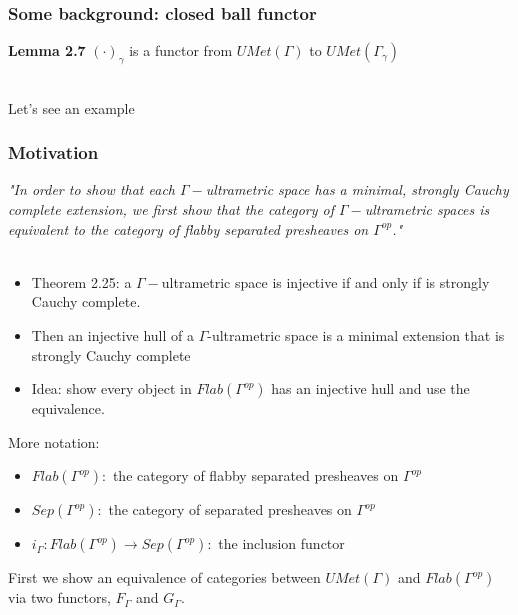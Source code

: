 \documentclass{beamer}
\begin{document}
\begin{frame}
	\frametitle{Some background: closed ball functor}
\textbf{Lemma 2.7} $(\cdot)_\gamma$ is a functor from $UMet(\Gamma)$ to $UMet(\Gamma_\gamma)$\\~\

Let's see an example
\end{frame}

\begin{frame}
\frametitle{Motivation}
\textit{"In order to show that each $\Gamma-$ultrametric space has a minimal, strongly Cauchy complete extension, we first show that the category of $\Gamma-$ultrametric spaces is equivalent to the category of flabby separated presheaves on $\Gamma^{op}$."}\\~\
\begin{itemize}
	\item Theorem 2.25: a $\Gamma-$ultrametric space is injective if and only if is strongly Cauchy complete.
	\item Then an injective hull of a $\Gamma$-ultrametric space is a minimal extension that is strongly Cauchy complete
	\item Idea: show every object in $Flab(\Gamma^{op})$ has an injective hull and use the equivalence.
\end{itemize}
\end{frame}

\begin{frame}
More notation:
\begin{itemize}
	\item $Flab(\Gamma^{op}):$ the category of flabby separated presheaves on $\Gamma^{op}$
	\item $Sep(\Gamma^{op}):$ the category of separated presheaves on $\Gamma^{op}$
	\item $i_\Gamma: Flab(\Gamma^{op}) \rightarrow Sep(\Gamma^{op}):$ the inclusion functor
\end{itemize}
\[\]
First we show an equivalence of categories between $UMet(\Gamma)$ and $Flab(\Gamma^{op})$ via two functors, $F_\Gamma$ and $G_\Gamma$.
\end{frame}	
\end{document}
